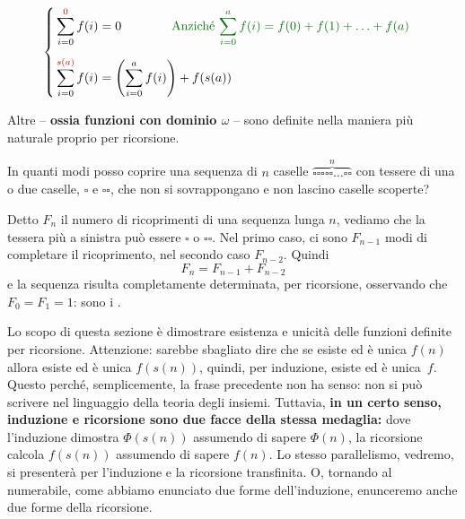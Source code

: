 \begin{definition}[Sommatoria]
\ 
\baselineskip
	\[\begin{cases}
		\displaystyle \mathrlap{\phantom{\sum}}\sum_{i = 0}^{{\drkred 0}} f(i) =
0\qquad\qquad\text{\drkgrn Anzich\'e $\displaystyle\sum_{i = 0}^a f(i) = f(0) + f(1) + \ldots + f(a)$}\\
		\displaystyle \mathrlap{\phantom{\sum^{\displaystyle\sum}}}\sum_{i = 0}^{{\drkred s(a)}} f(i) = \left(\sum_{i=0}^{a} f(i) \right) + f(s(a))
	\end{cases}
		\]
\end{definition}

Altre  -- \textbf{ossia funzioni con dominio $\omega$}
-- sono definite nella maniera pi\`u naturale proprio per ricorsione.

\begin{example}
	In quanti modi posso coprire una sequenza di $n$ caselle
$\overbrace{\square\!\square\!\square\!\square\!\square\ldots\square\!\square}^{n}$ con tessere di una o due caselle,
	$\square$ e $\square\!\square$, che non si sovrappongano e non lascino caselle scoperte?
\end{example}

\begin{soln}
	Detto $F_n$ il numero di ricoprimenti di una sequenza lunga $n$,
vediamo che la tessera pi\`u a sinistra pu\`o essere $\square$ o
$\square\!\square$. Nel primo caso, ci sono 
	$F_{n-1}$ modi di completare il ricoprimento, nel secondo caso
$F_{n-2}$. Quindi
	\[ F_n = F_{n-1} + F_{n-2} \]
e la sequenza risulta completamente determinata, per ricorsione, osservando che $F_0 = F_1 = 1$: sono i .
\end{soln}

Lo scopo di questa sezione \`e dimostrare esistenza e unicit\`a delle
funzioni definite per ricorsione. {\drkred Attenzione: sarebbe sbagliato}
dire che se esiste ed \`e unica $f(n)$ allora esiste ed \`e unica
$f(s(n))$, quindi, per induzione, esiste ed \`e unica~$f$. Questo
perch\'e, semplicemente, la frase precedente non ha senso: non si pu\`o scrivere nel linguaggio
della teoria degli insiemi.
Tuttavia, \textbf{in un certo senso, induzione e ricorsione sono due facce
della stessa medaglia:} dove l'induzione dimostra $\Phi(s(n))$ assumendo di sapere 
$\Phi(n)$, la ricorsione calcola $f(s(n))$ assumendo di sapere $f(n)$. Lo stesso parallelismo, vedremo, si presenter\`a per l'induzione e la ricorsione transfinita.
O, tornando al numerabile, come abbiamo enunciato due forme
dell'induzione, enunceremo anche due forme della ricorsione.


